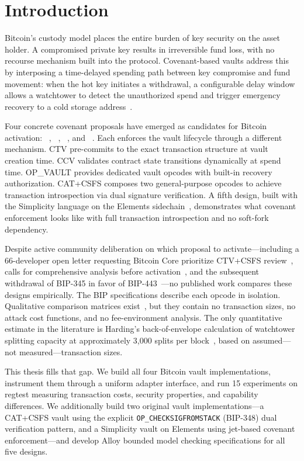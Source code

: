 \chapter{Introduction} \label{ch:introduction}

Bitcoin's custody model places the entire burden of key security on the asset holder.
A compromised private key results in irreversible fund loss, with no recourse mechanism
built into the protocol. Covenant-based vaults address this by interposing a time-delayed
spending path between key compromise and fund movement: when the hot key initiates a
withdrawal, a configurable delay window allows a watchtower to detect the unauthorized
spend and trigger emergency recovery to a cold storage address~\cite{SHMB20, MES16}.

Four concrete covenant proposals have emerged as candidates for Bitcoin activation:
\opctv{}~\cite{BIP119}, \opccv{}~\cite{BIP443}, \opvault{}~\cite{BIP345}, and
\catcsfs{}~\cite{BIP347, BIP348}. Each enforces the vault lifecycle through a different
mechanism. CTV pre-commits to the exact transaction structure at vault creation time.
CCV validates contract state transitions dynamically at spend time. OP\_VAULT provides
dedicated vault opcodes with built-in recovery authorization. CAT+CSFS composes two
general-purpose opcodes to achieve transaction introspection via dual signature
verification. A fifth design, built with the Simplicity language on the Elements
sidechain~\cite{OC17}, demonstrates what covenant enforcement looks like with full
transaction introspection and no soft-fork dependency.

Despite active community deliberation on which proposal to activate---including a
66-developer open letter requesting Bitcoin Core prioritize CTV+CSFS
review~\cite{CTVCSFS25}, calls for comprehensive analysis before
activation~\cite{Poinsot25, Towns25}, and the subsequent withdrawal of BIP-345
in favor of BIP-443~\cite{OB25}---no published work compares these designs
empirically. The BIP
specifications describe each opcode in isolation. Qualitative comparison matrices
exist~\cite{covenants_info}, but they contain no transaction sizes, no attack cost
functions, and no fee-environment analysis. The only quantitative estimate in the
literature is Harding's back-of-envelope calculation of watchtower splitting capacity
at approximately 3{,}000 splits per block~\cite{Har24}, based on assumed---not
measured---transaction sizes.

This thesis fills that gap. We build all four Bitcoin vault implementations, instrument
them through a uniform adapter interface, and run 15 experiments on regtest measuring
transaction costs, security properties, and capability differences. We additionally
build two original vault implementations---a CAT+CSFS vault using the explicit
\texttt{OP\_CHECKSIGFROMSTACK} (BIP-348) dual verification pattern, and a Simplicity
vault on Elements using jet-based covenant enforcement---and develop Alloy bounded
model checking specifications for all five designs.

